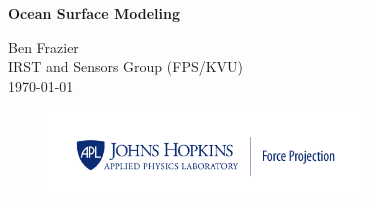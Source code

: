 \titlepage
\thispagestyle{fancy}
\begin{center}
\vspace*{50pt}
{\huge \bfseries Ocean Surface Modeling\\}
\vspace{75 pt}

\Large Ben Frazier \\
\large IRST and Sensors Group (FPS/KVU)\\
\vspace{25pt}
\large \today \\

\begin{figure}[!b]
\begin{center}
\includegraphics[width=0.75\textwidth]{../media/FP_Blue.png}
\end{center}
\end{figure}

\end{center}

